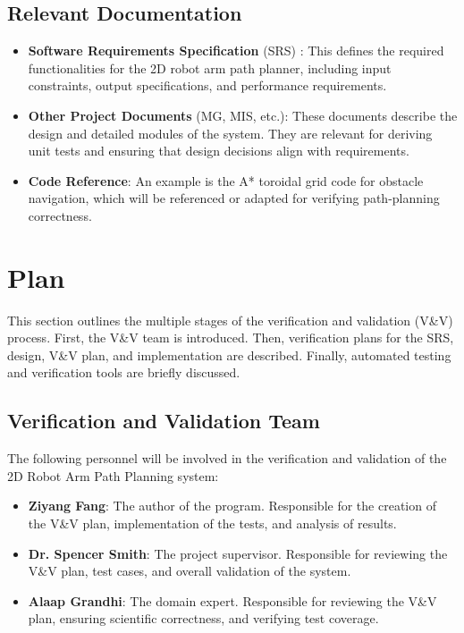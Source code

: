 \documentclass[12pt, titlepage]{article}
\begin{document}
\subsection{Relevant Documentation}
\begin{itemize}
  \item \textbf{Software Requirements Specification} (SRS) :
  This defines the required functionalities for the 2D robot arm path planner, including input constraints, output specifications, and performance requirements.\cite{SRS}
  \item \textbf{Other Project Documents} (MG, MIS, etc.):
  These documents describe the design and detailed modules of the system. They are relevant for deriving unit tests and ensuring that design decisions align with requirements.
  \item \textbf{Code Reference}:
  An example is the A* toroidal grid code for obstacle navigation, which will be referenced or adapted for verifying path-planning correctness.
\end{itemize}




\section{Plan}

This section outlines the multiple stages of the verification and validation (V\&V) process. First, the V\&V team is introduced. Then, verification plans for the SRS, design, V\&V plan, and implementation are described. Finally, automated testing and verification tools are briefly discussed.

\subsection{Verification and Validation Team}

The following personnel will be involved in the verification and validation of the 2D Robot Arm Path Planning system:

\begin{itemize}
    \item \textbf{Ziyang Fang}: The author of the program. Responsible for the creation of the V\&V plan, implementation of the tests, and analysis of results.
    \item \textbf{Dr. Spencer Smith}: The project supervisor. Responsible for reviewing the V\&V plan, test cases, and overall validation of the system.
    \item \textbf{Alaap Grandhi}: The domain expert. Responsible for reviewing the V\&V plan, ensuring scientific correctness, and verifying test coverage.
\end{itemize}
\end{document}
